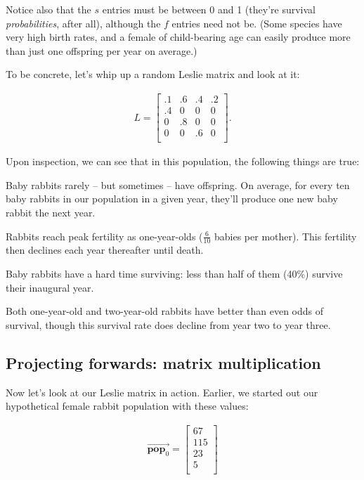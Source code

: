\begin{alttitles}
Notice also that the $s$ entries must be between 0 and 1 (they're survival
\textit{probabilities}, after all), although the $f$ entries need not be. (Some
species have very high birth rates, and a female of child-bearing age can
easily produce more than just one offspring per year on average.)

To be concrete, let's whip up a random Leslie matrix and look at it:

\vspace{-.15in}
\begin{align*}
L =
\begin{bmatrix}
.1 & .6 & .4 & .2 \\
.4 & 0 & 0 & 0 \\
0 & .8 & 0 & 0 \\
0 & 0 & .6 & 0 \\
\end{bmatrix}.
\end{align*}
\vspace{-.15in}

Upon inspection, we can see that in this population, the following things are
true:

\begin{compactitem}
\item Baby rabbits rarely -- but sometimes -- have offspring. On average, for
every ten baby rabbits in our population in a given year, they'll produce one
new baby rabbit the next year.
\item Rabbits reach peak fertility as one-year-olds ($\frac{6}{10}$ babies per
mother). This fertility then declines each year thereafter until death.
\item Baby rabbits have a hard time surviving: less than half of them (40\%)
survive their inaugural year.
\item Both one-year-old and two-year-old rabbits have better than even odds of
survival, though this survival rate does decline from year two to year three.
\end{compactitem}


\subsection{Projecting forwards: matrix multiplication}

Now let's look at our Leslie matrix in action. Earlier, we started out our
hypothetical female rabbit population with these values:

\vspace{-.15in}
\begin{align*}
\overrightarrow{\textbf{pop}_0} =
\begin{bmatrix}
67 \\ 115 \\ 23 \\ 5 \\
\end{bmatrix}
\end{align*}
\vspace{-.15in}


\end{alttitles}
